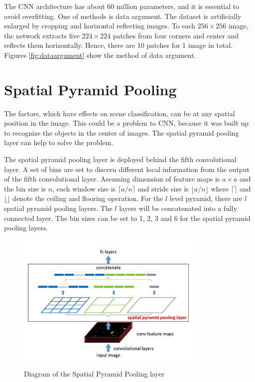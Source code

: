 The CNN architecture\citep{krizhevsky2012imagenet} has about 60 million parameters, and it is essential to avoid overfitting. One of methods is data argument. The dataset is artificially enlarged by cropping and horizontal reflecting images. To each $256\times256$ image, the network extracts five $224\times224$ patches from four corners and center and reflects them horizontally. Hence, there are 10 patches for 1 image in total. Figures \ref{fig:dataargument} show the method of data argument.

\section{Spatial Pyramid Pooling}

The factors, which have effects on scene classification, can be at any spatial position in the image. This could be a problem to CNN, because it was built up to recognize the objects in the center of images. The spatial pyramid pooling layer can help to solve the problem.

The spatial pyramid pooling layer is deployed behind the fifth convolutional layer. A set of bins are set to discern different local information from the output of the fifth convolutional layer. Assuming dimension of feature maps is $a\times a$ and the bin size is $n$, each window size is $\lceil a/n \rceil$ and stride size is $\lfloor a/n \rfloor$ where $\lceil  \rceil$ and $\lfloor  \rfloor$ denote the ceiling and flooring operation. For the $l$ level pyramid, there are $l$ spatial pyramid pooling layers. The $l$ layers will be concatenated into a fully connected layer. The bin sizes can be set to 1, 2, 3 and 6 for the spatial pyramid pooling layers.

\begin{figure}[htb]
    \centering
	\includegraphics[width=0.8\textwidth]{sppnet.jpg}
    \caption{Diagram of the Spatial Pyramid Pooling layer}%
    \label{fig:sppnet}%
\end{figure}

